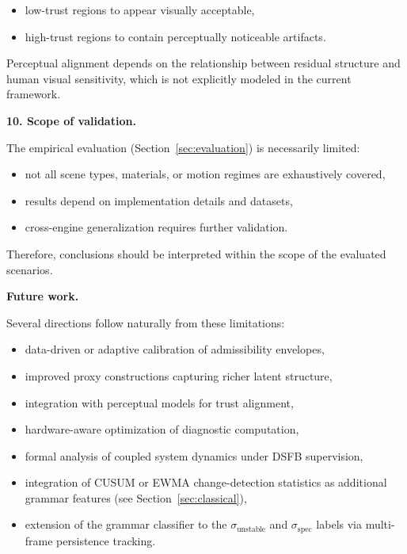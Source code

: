 \documentclass[11pt]{article}
\theoremstyle{definition}
\theoremstyle{plain}
\begin{document}
\begin{itemize}[leftmargin=1.5em]
    \item low-trust regions to appear visually acceptable,
    \item high-trust regions to contain perceptually noticeable artifacts.
\end{itemize}

Perceptual alignment depends on the relationship between residual structure and human visual sensitivity, which is not explicitly modeled in the current framework.

\vspace{0.5em}
\noindent
\textbf{10. Scope of validation.}

The empirical evaluation (Section~\ref{sec:evaluation}) is necessarily limited:

\begin{itemize}[leftmargin=1.5em]
    \item not all scene types, materials, or motion regimes are exhaustively covered,
    \item results depend on implementation details and datasets,
    \item cross-engine generalization requires further validation.
\end{itemize}

Therefore, conclusions should be interpreted within the scope of the evaluated scenarios.

\vspace{0.5em}
\noindent
\textbf{Future work.}

Several directions follow naturally from these limitations:

\begin{itemize}[leftmargin=1.5em]
    \item data-driven or adaptive calibration of admissibility envelopes,
    \item improved proxy constructions capturing richer latent structure,
    \item integration with perceptual models for trust alignment,
    \item hardware-aware optimization of diagnostic computation,
    \item formal analysis of coupled system dynamics under DSFB supervision,
    \item integration of CUSUM or EWMA change-detection statistics as additional grammar features (see Section~\ref{sec:classical}),
    \item extension of the grammar classifier to the $\sigma_{\mathrm{unstable}}$ and $\sigma_{\mathrm{spec}}$ labels via multi-frame persistence tracking.
\end{itemize}
\end{document}

